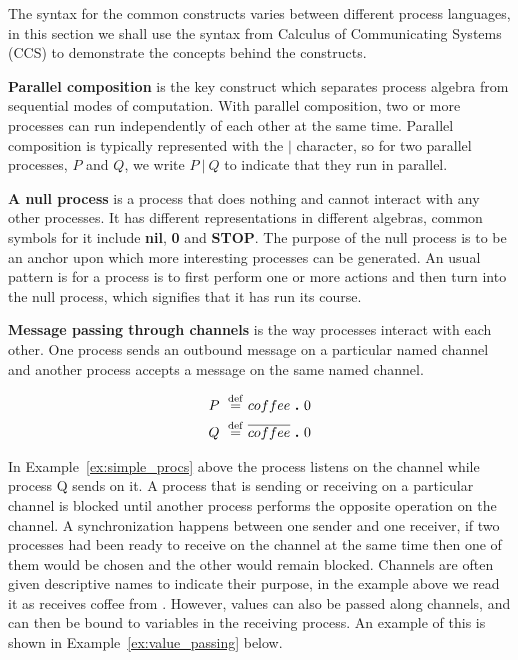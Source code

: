 	The syntax for the common constructs varies between different process 
	languages, in this section we shall use the syntax from Calculus of 
	Communicating Systems (CCS) to demonstrate the concepts behind the constructs.
	
	\textbf{Parallel composition} is the key construct which separates process 
	algebra from sequential modes of computation. With parallel composition, two 
	or more processes can run independently of each other at the same time. 
	Parallel composition is typically represented with the $|$ character, so for 
	two parallel processes, $P$ and $Q$, we write $P\ |\ Q$ to indicate that 
	they run in parallel.

	\textbf{A null process} is a process that does nothing and cannot interact 
	with any other processes. It has different representations in different 
	algebras, common symbols for it include \textbf{nil}, \textbf{0} and 
	\textbf{STOP}. The purpose of the null process is to be an anchor upon which 
	more interesting processes can be generated. An usual pattern is for a 
	process is to first perform one or more actions and then turn into the null 
	process, which signifies that it has run its course.
	
	\textbf{Message passing through channels} is the way processes interact with 
	each other. One process sends an outbound message on a particular named 
	channel and another process accepts a message on the same named channel. 

	\begin{Exa}
	\label{ex:simple_procs}
	\begin{align*}
			P \ \stackrel{\mathrm{def}}{=}\  & coffee \ \textbf{.}\  0 \\
			Q \ \stackrel{\mathrm{def}}{=}\  & \overline{coffee} \ \textbf{.}\  0 
	\end{align*}	
	\end{Exa}
				
	In Example~\ref{ex:simple_procs} above the process  listens on the 
	 channel while process Q sends on it. A process that is 
	sending or receiving on a particular channel is blocked until another process
	performs the opposite operation on the channel. A synchronization happens 
	between one sender and one receiver, if two processes had been ready to 
	receive on the  channel at the same time then one of them 
	would be chosen and the other would remain blocked. Channels are often given 
	descriptive names to indicate their purpose, in the example above we read it 
	as  receives coffee from . However, values can also be passed 
	along channels, and can then be bound to variables in the receiving process. 
	An example of this is shown in Example~\ref{ex:value_passing} below.
	
